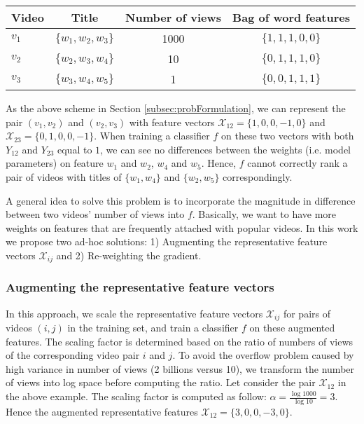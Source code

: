 		\begin{center}
			\begin{tabular}{| l | c | c | c |}
					\hline
				Video & Title & Number of views & Bag of word features \\ \hline
				$v_1$ & $\{w_1, w_2, w_3\}$ &	1000 & $\{1, 1, 1, 0 ,0 \}$	\\ \hline
				$v_2$ & $\{w_2, w_3, w_4\}$ & 10 & $\{0, 1, 1, 1 ,0 \}$	\\ \hline
				$v_3$ & $\{w_3, w_4, w_5\}$ & 1 & $\{0, 0, 1, 1 ,1 \}$	\\ \hline
			\end{tabular}
		\end{center}

	As the above scheme in Section \ref{subsec:probFormulation}, we can represent the pair $(v_1, v_2)$ and $(v_2, v_3)$ with feature vectors $\mathcal{X}_{12}=\{1, 0, 0, -1, 0\}$ and $\mathcal{X}_{23}=\{0, 1, 0, 0 , -1 \}$. When training a classifier $f$ on these two vectors with both $Y_{12}$ and $Y_{23}$ equal to $1$, we can see no differences between the weights (i.e. model parameters) on feature $w_1$ and $w_2$, $w_4$ and $w_5$. Hence, $f$ cannot correctly rank a pair of videos with titles of $\{w_1, w_4\}$ and $\{w_2, w_5\}$ correspondingly.

	A general idea to solve this problem is to incorporate the magnitude in difference between two videos' number of views into $f$. Basically, we want to have more weights on features that are frequently attached with popular videos. In this work we propose two ad-hoc solutions: 1) Augmenting the representative feature vectors $\mathcal{X}_{ij}$ and 2) Re-weighting the gradient.

	\subsubsection{Augmenting the representative feature vectors}
		In this approach, we scale the representative feature vectors $\mathcal{X}_{ij}$ for pairs of videos $(i, j)$ in the training set, and train a classifier $f$ on these augmented features. The scaling factor is determined based on the ratio of numbers of views of the corresponding video pair $i$ and $j$. To avoid the overflow problem caused by high variance in number of views (2 billions versus 10), we transform the number of views into log space before computing the ratio. Let consider the pair $\mathcal{X}_{12}$ in the above example. The scaling factor is computed as follow: $\alpha = \frac{\log 1000}{\log 10} = 3$. Hence the augmented representative features $\mathcal{X}_{12} = \{3, 0, 0, -3, 0\}$. 

